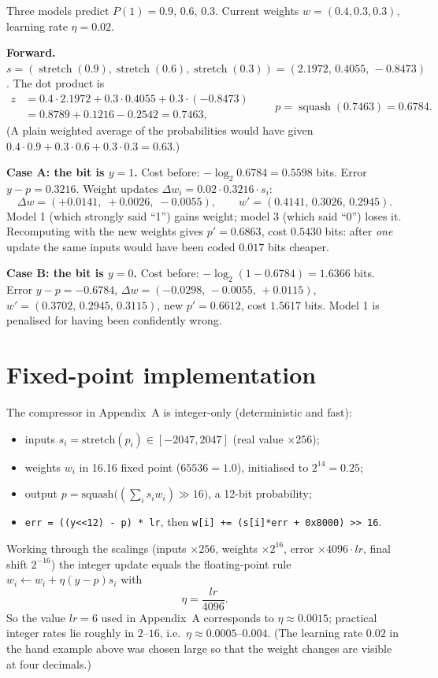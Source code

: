 \documentclass[11pt,a4paper,openany]{book}
\newcommand{\st}{\operatorname{stretch}}
\newcommand{\sq}{\operatorname{squash}}
\newcommand{\code}[1]{\texttt{#1}}
\theoremstyle{definition}
\theoremstyle{remark}
\begin{document}
\begin{example}
Three models predict $P(1)=0.9,\,0.6,\,0.3$. Current weights $w=(0.4,0.3,0.3)$, learning rate $\eta=0.02$.

\textbf{Forward.} $s=(\st(0.9),\st(0.6),\st(0.3))=(2.1972,\,0.4055,\,-0.8473)$. The dot product is
\[
\begin{aligned}z&=0.4\cdot2.1972+0.3\cdot0.4055+0.3\cdot(-0.8473)\\&=0.8789+0.1216-0.2542=0.7463,\end{aligned}\qquad p=\sq(0.7463)=0.6784.
\]
(A plain weighted average of the probabilities would have given $0.4\cdot0.9+0.3\cdot0.6+0.3\cdot0.3=0.63$.)

\textbf{Case A: the bit is $y=1$.} Cost before: $-\log_2 0.6784=0.5598$ bits. Error $y-p=0.3216$. Weight updates $\Delta w_i=0.02\cdot0.3216\cdot s_i$:
\[
\Delta w=(+0.0141,\;+0.0026,\;-0.0055),\qquad w'=(0.4141,\,0.3026,\,0.2945).
\]
Model 1 (which strongly said ``1'') gains weight; model 3 (which said ``0'') loses it. Recomputing with the new weights gives $p'=0.6863$, cost $0.5430$ bits: after \emph{one} update the same inputs would have been coded $0.017$ bits cheaper.

\textbf{Case B: the bit is $y=0$.} Cost before: $-\log_2(1-0.6784)=1.6366$ bits. Error $y-p=-0.6784$, $\Delta w=(-0.0298,\,-0.0055,\,+0.0115)$, $w'=(0.3702,\,0.2945,\,0.3115)$, new $p'=0.6612$, cost $1.5617$ bits. Model 1 is penalised for having been confidently wrong.
\end{example}

\section{Fixed-point implementation}

The compressor in Appendix~A is integer-only (deterministic and fast):
\begin{itemize}
\item inputs $s_i=\text{stretch}(p_i)\in[-2047,2047]$ (real value $\times256$);
\item weights $w_i$ in 16.16 fixed point ($65536=1.0$), initialised to $2^{14}=0.25$;
\item output $p=\text{squash}\big((\sum_is_iw_i)\gg16\big)$, a 12-bit probability;
\item \code{err = ((y<<12) - p) * lr}, then \code{w[i] += (s[i]*err + 0x8000) >> 16}. 
\end{itemize}
Working through the scalings (inputs $\times256$, weights $\times2^{16}$, error $\times4096\cdot lr$, final shift $2^{-16}$) the integer update equals the floating-point rule $w_i\leftarrow w_i+\eta(y-p)s_i$ with
\[
\eta=\frac{lr}{4096}.
\]
So the value $lr=6$ used in Appendix~A corresponds to $\eta\approx0.0015$; practical integer rates lie roughly in $2$--$16$, i.e.\ $\eta\approx0.0005$--$0.004$. (The learning rate $0.02$ in the hand example above was chosen large so that the weight changes are visible at four decimals.)
\end{document}

